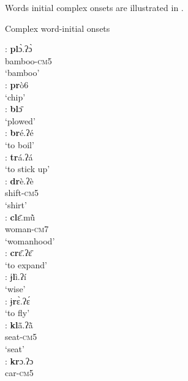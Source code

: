 \documentclass[output=paper]{langscibook}
\begin{document}
\noindent Words initial complex onsets are illustrated in . 

 \begin{exe}
    \ex Complex word-initial onsets\label{ex:traore:complexOnsetWordInitial:12}
    \nopagebreak
    \begin{multicols}{2}
    \begin{xlisti}
        \ex \glll [pl]: \textbf{pl}ɔ̀.ʔɔ̀ \\
            {}      bamboo-\textsc{cm}5\\
            {} ‘bamboo’\\ 
        \ex \gll [pr]: \textbf{pr}ò6\\
            {}  `chip'\\
        \ex \gll [bl]:        \textbf{bl}ɔ̄ \\
            {}      `plowed'\\
        \ex \gll [br]:      \textbf{br}é.ʔé \\
            {} {`to boil'}\\
        \ex \gll [tr]:        \textbf{tr}á.ʔá\\
            {}      {`to stick up'}\\
        \ex \glll [dr]:      \textbf{dr}è.ʔè \\
            {}      shift-\textsc{cm}5\\
            {}      `shirt'\\
        \ex \glll [cl]:       \textbf{cl}ɛ̄.mũ̀ \\
            {} woman-\textsc{cm}7\\
            {} `womanhood'\\
        \ex \gll [cr]:        \textbf{cr}ɛ̄.ʔɛ̄  \\
            {}          {`to expand'}\\
        \ex \gll [ɉl]:         ɉ\textbf{l}ì.ʔí\\
            {}          `wise'\\
        \ex  \gll [ɉr]:        ɉ\textbf{r}ɛ̀.ʔɛ́ \\
            {}          {`to fly'}\\
        \ex \glll [kl]:       \textbf{kl}\={ã}.ʔ\`{ã}\\
            {} seat-\textsc{cm}5\\
            {} `seat'\\
        \ex \glll  [kr]:       \textbf{kr}ɔ.ʔɔ \\
            {} car-\textsc{cm}5\\

\end{xlisti}
\end{multicols}
\end{exe}
\end{document}
